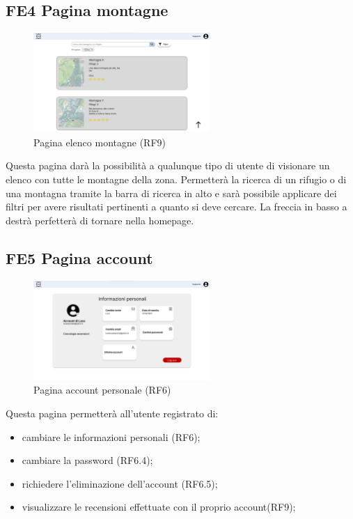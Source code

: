 \documentclass[a4paper,12pt]{article}
\begin{document}
\subsection*{FE4 Pagina montagne}
\begin{figure}[H]
   \centering
    \includegraphics[width=0.6\textwidth]{img/Pagina montagne.png}
    \caption{Pagina elenco montagne (RF9)}
\end{figure}
Questa pagina darà la possibilità a qualunque tipo di utente di visionare un elenco con tutte le montagne della zona. Permetterà la ricerca di un rifugio o di una montagna tramite la barra di ricerca in alto e sarà possibile applicare dei filtri per avere risultati pertinenti a quanto si deve cercare. La freccia in basso a destrà perfetterà di tornare nella homepage.


\subsection*{FE5 Pagina account}
\begin{figure}[H]
   \centering
    \includegraphics[width=0.6\textwidth]{img/Pagina account.png}
    \caption{Pagina account personale (RF6)}
\end{figure}

\newpage
Questa pagina permetterà all'utente registrato di:
\begin{itemize}
    \item cambiare le informazioni personali (RF6);
    \item cambiare la password (RF6.4);
    \item richiedere l'eliminazione dell'account (RF6.5);
    \item visualizzare le recensioni effettuate con il proprio account(RF9);
\end{itemize}
\end{document}
